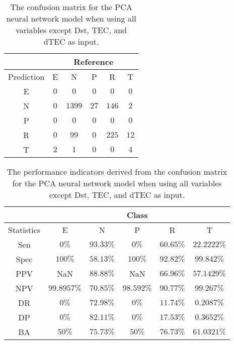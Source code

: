 \begin{table}[!ht]
	\centering
	\begin{tabular}{|c|c|c|c|c|c|}
		\hline
		 & \multicolumn{5}{|c|}{Reference} \\ \hline
		 Prediction & E & N & P & R & T \\ \hline
		 E & $0$ & $0$ & $0$ & $0$ & $0$ \\ \hline
		 N & $0$ & $1399$ & $27$ & $146$ & $2$ \\ \hline
		 P & $0$ & $0$ & $0$ & $0$ & $0$ \\ \hline
		 R & $0$ & $99$ & $0$ & $225$ & $12$ \\ \hline
		 T & $2$ & $1$ & $0$ & $0$ & $4$ \\ \hline
	\end{tabular}
	\caption{The confusion matrix for the PCA neural network model when using all variables except Dst, TEC, and dTEC as input.}
	\label{tab:cm:noTEC:pcaNNet}
\end{table}

\begin{table}[!ht]
	\centering
	\begin{tabular}{|c|c|c|c|c|c|}
		\hline
		 & \multicolumn{5}{c|}{Class} \\ \hline
		Statistics & E & N & P & R & T \\ \hline
		Sen & $0\%$ & $93.33\%$ & $0\%$ & $60.65\%$ & $22.2222\%$ \\ \hline
		Spec & $100\%$ & $58.13\%$ & $100\%$ & $92.82\%$ & $99.842\%$ \\ \hline
		PPV & NaN & $88.88\%$ & NaN & $66.96\%$ & $57.1429\%$ \\ \hline
		NPV & $99.8957\%$ & $70.85\%$ & $98.592\%$ & $90.77\%$ & $99.267\%$ \\ \hline
		DR & $0\%$ & $72.98\%$ & $0\%$ & $11.74\%$ & $0.2087\%$ \\ \hline
		DP & $0\%$ & $82.11\%$ & $0\%$ & $17.53\%$ & $0.3652\%$ \\ \hline
		BA & $50\%$ & $75.73\%$ & $50\%$ & $76.73\%$ & $61.0321\%$ \\ \hline
	\end{tabular}
	\caption{The performance indicators derived from the confusion matrix for the PCA neural network model when using all variables except Dst, TEC, and dTEC as input.}
	\label{tab:cs:reverse:noTEC:pcaNNet}
\end{table}

